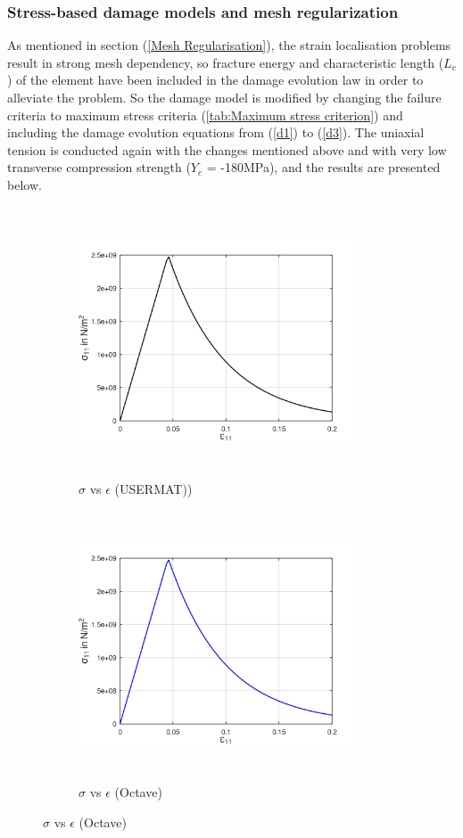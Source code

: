 \documentclass[12pt,a4paper,twoside,openright]{report}
\begin{document}
\subsubsection{Stress-based damage models and mesh regularization}
\indent\indent\indent As mentioned in section (\ref{Mesh Regularisation}), the strain localisation problems result in strong mesh dependency, so fracture energy and characteristic length ($L_{c}$) of the element have been included in the damage evolution law in order to alleviate the problem. So the damage model is modified by changing the failure criteria to maximum stress criteria (\ref{tab:Maximum stress criterion}) and including the damage evolution equations from (\ref{d1}) to (\ref{d3}). The uniaxial tension is conducted again with the changes mentioned above and with very low transverse compression strength ($Y_{c}$ = -180MPa), and the results are presented below.
\begin{figure}[htbp!]
     \captionsetup[subfigure]{justification=centering}
     \begin{subfigure}{0.4\textwidth}
         \includegraphics[width=8.3cm,height=8cm,keepaspectratio]{22.StressvsStrain_Ansys.png}
         \caption{$\sigma$ vs $\epsilon$ (USERMAT))}
         \label{fig:Stress-Strain relation in Ansys2}
     \end{subfigure}
     \hspace{1.8cm}
     \begin{subfigure}{0.4\textwidth}
          \includegraphics[width=8.3cm,height=8cm,keepaspectratio]{22.StressvsStrain_Octave.png}
         \caption{$\sigma$ vs $\epsilon$ (Octave)}
         \label{fig:Stress-Strain relation Octave2}
     \end{subfigure}
\end{figure}
\end{document}
